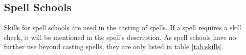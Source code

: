 \begin{multicols*}{2}

    \section{Spell Schools}\label{spell-schools}
    Skills for spell schools are used in the casting of spells. If a spell requires
    a skill check, it will be mentioned in the spell's description. As spell
    schools have no further use beyond casting spells, they are only listed in
    table \ref{tab:skills}.
\end{multicols*}

